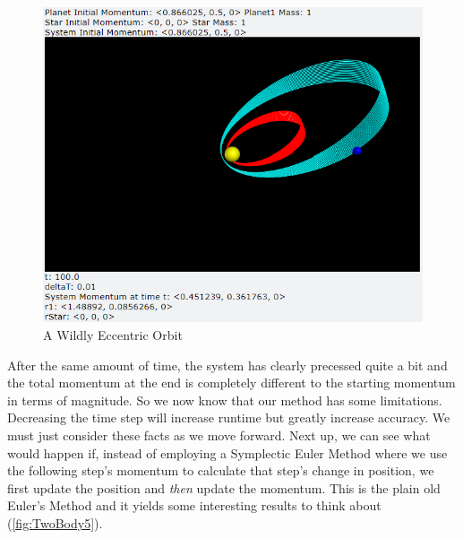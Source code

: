 \documentclass[12pt]{article}
\begin{document}
\begin{enumerate}
        \begin{figure}[H]
            \begin{center}
               \includegraphics[scale=.5]{TwoBody4.png}
               \caption{A Wildly Eccentric Orbit}
               \label{fig:TwoBody4}
            \end{center}
        \end{figure}
        \noindent
        After the same amount of time, the system has clearly precessed quite a bit and the total momentum 
        at the end is completely different to the starting momentum in terms of magnitude. So we now know 
        that our method has some limitations. Decreasing the time step will increase runtime but greatly 
        increase accuracy. We must just consider these facts as we move forward. \newline
        \newline
        Next up, we can see what would happen if, instead of employing a Symplectic Euler Method where we 
        use the following step's momentum to calculate that step's change in position, we first update the 
        position and \emph{then} update the momentum. This is the plain old Euler's Method and it yields 
        some interesting results to think about (\autoref{fig:TwoBody5}).


\end{enumerate}
\end{document}
